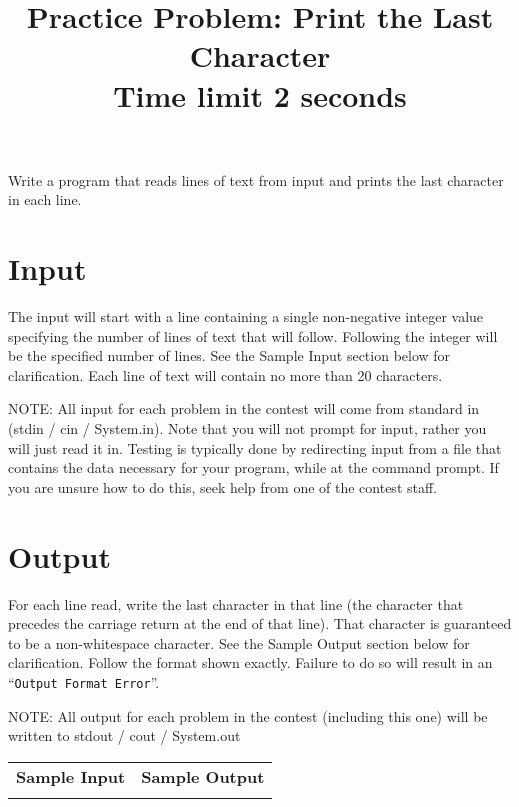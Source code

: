 \documentclass{article}
\title{Practice Problem:
 Print the Last Character\\ 
Time limit 2 seconds}
\date{}
\begin{document}
\maketitle

Write a program that reads lines of text from input and prints the last character in each line.


\section{Input}

The input will start with a line containing a single non-negative integer 
value specifying the number of lines of text that will follow.  Following 
the integer will be the specified number of lines.  See the Sample Input 
section below for clarification.  Each line of text will contain no more 
than 20 characters.

NOTE: All input for each problem in the contest will come from standard in 
(stdin / cin / System.in).  Note that you will not prompt for input, 
rather you will just read it in.  Testing is typically done by redirecting 
input from a file that contains the data necessary for your program, while 
at the command prompt.  If you are unsure how to do this, seek help from 
one of the contest staff.
\section{Output}

For each line read, write the last character in that line (the character 
that precedes the carriage return at the end of that line).  That character 
is guaranteed to be a non-whitespace character.  See the Sample Output section 
below for clarification.  Follow the format shown exactly. Failure to do so 
will result in an ``\verb+Output Format Error+''. 

NOTE: All output for each problem in the contest (including this one) will 
be written to stdout / cout / System.out
\vskip 16pt
\noindent
\setlength{\extrarowheight}{4pt}
\begin{tabularx}{\textwidth}{ | p{5cm} | X | }
\hline
\textbf{Sample Input} & \textbf{Sample Output} \\

&

\\
\hline
\end{tabularx}
\end{document}
